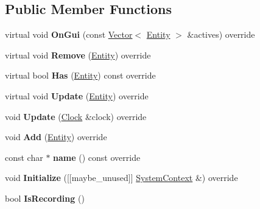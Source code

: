 \subsection*{Public Member Functions}
\begin{DoxyCompactItemize}
\item 
\mbox{\label{classnabla_1_1_playback_system_a3a765b254bb7c8851affa0baa51e7f91}} 
virtual void {\bfseries On\+Gui} (const \mbox{\hyperlink{classnabla_1_1_s_t_l_vector_ex}{Vector}}$<$ \mbox{\hyperlink{structnabla_1_1_entity}{Entity}} $>$ \&actives) override
\item 
\mbox{\label{classnabla_1_1_playback_system_a9c72e1bc4cce532057d70a101462eec9}} 
virtual void {\bfseries Remove} (\mbox{\hyperlink{structnabla_1_1_entity}{Entity}}) override
\item 
\mbox{\label{classnabla_1_1_playback_system_a7d47483da997ff1322022798f9903005}} 
virtual bool {\bfseries Has} (\mbox{\hyperlink{structnabla_1_1_entity}{Entity}}) const override
\item 
\mbox{\label{classnabla_1_1_playback_system_a7f3050656e40093920a6432dc6aaa8bd}} 
virtual void {\bfseries Update} (\mbox{\hyperlink{structnabla_1_1_entity}{Entity}}) override
\item 
\mbox{\label{classnabla_1_1_playback_system_ab87e340fca72bb4de60377f7c4d36a23}} 
void {\bfseries Update} (\mbox{\hyperlink{classnabla_1_1_clock}{Clock}} \&clock) override
\item 
\mbox{\label{classnabla_1_1_playback_system_ac0f3cc8beef486e3092520dcdaa1c256}} 
void {\bfseries Add} (\mbox{\hyperlink{structnabla_1_1_entity}{Entity}}) override
\item 
\mbox{\label{classnabla_1_1_playback_system_a8eadf438194f95d477b95394ce18696e}} 
const char $\ast$ {\bfseries name} () const override
\item 
\mbox{\label{classnabla_1_1_playback_system_af13332fd4e31368aacb52a5b6168c5fa}} 
void {\bfseries Initialize} (\mbox{[}\mbox{[}maybe\+\_\+unused\mbox{]}\mbox{]} \mbox{\hyperlink{structnabla_1_1_system_context}{System\+Context}} \&) override
\item 
\mbox{\label{classnabla_1_1_playback_system_a1b9d98a9034c3459e3202c048dc9f271}} 
bool {\bfseries Is\+Recording} ()
\end{DoxyCompactItemize}


